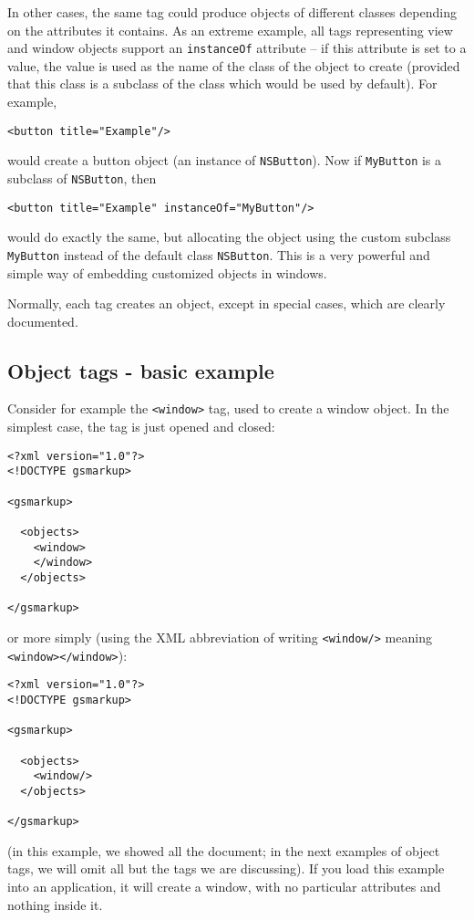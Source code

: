 In other cases, the same tag could produce objects of different
classes depending on the attributes it contains.  As an extreme
example, all tags representing view and window objects support an
\texttt{instanceOf} attribute -- if this attribute is set to a value, 
the value is used as the name of the class of the object to create
(provided that this class is a subclass of the class which would be
used by default).  For example,
\begin{verbatim}
<button title="Example"/>
\end{verbatim}
would create a button object (an instance of \texttt{NSButton}).  Now
if \texttt{MyButton} is a subclass of \texttt{NSButton}, then
\begin{verbatim}
<button title="Example" instanceOf="MyButton"/>
\end{verbatim}
would do exactly the same, but allocating the object using the custom
subclass \texttt{MyButton} instead of the default class
\texttt{NSButton}.  This is a very powerful and simple way of embedding 
customized objects in windows.

Normally, each tag creates an object, except in special cases, which
are clearly documented.

\subsection{Object tags - basic example}
Consider for example the \texttt{<window>} tag, used to create a
window object.  In the simplest case, the tag is just opened and
closed:
\begin{verbatim}
<?xml version="1.0"?>
<!DOCTYPE gsmarkup>

<gsmarkup>

  <objects>
    <window>
    </window>
  </objects>

</gsmarkup>
\end{verbatim}
or more simply (using the XML abbreviation of writing
\texttt{<window/>} meaning \texttt{<window></window>}):
\begin{verbatim}
<?xml version="1.0"?> 
<!DOCTYPE gsmarkup>

<gsmarkup>

  <objects>
    <window/>
  </objects>

</gsmarkup>
\end{verbatim}
(in this example, we showed all the document; in the next examples of
object tags, we will omit all but the tags we are discussing).  If you
load this example into an application, it will create a window, with
no particular attributes and nothing inside it.

